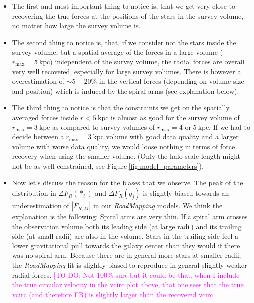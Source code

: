 \documentclass[iop,revtex4,numberedappendix,appendixfloats]{emulateapj}
\newcommand{\RM}{{\sl RoadMapping}}
\newcommand{\Wilma}[1]{\textcolor{Magenta}{#1}}
\begin{document}
\begin{itemize}
\item The first and most important thing to notice is, that we get very close to recovering the true forces at the positions of the stars in the survey volume, no matter how large the survey volume is.
\item The second thing to notice is, that, if we consider not the stars inside the survey volume, but a spatial average of the forces in a large volume ($r_\text{max}=5~\text{kpc}$) independent of the survey volume, the radial forces are overall very well recovered, especially for large survey volumes. There is however a overestimation of $\sim5-20\%$ in the vertical forces (depending on volume size and position) which is induced by the spiral arms (see explanation below).
\item The third thing to notice is that the constraints we get on the spatially averaged forces inside $r<5~\text{kpc}$ is almost as good for the survey volume of $r_\text{max}=3~\text{kpc}$ as compared to survey volumes of $r_\text{max}=4$ or $5~\text{kpc}$. If we had to decide between a $r_\text{max}=3~\text{kpc}$ volume with good data quality and a larger volume with worse data quality, we would loose nothing in terms of force recovery when using the smaller volume. (Only the halo scale length might not be as well constrained, see Figure \ref{fig:model_parameters}).

\item Now let's discuss the reason for the biases that we observe. The peak of the distribution in $\Delta F_R(*_i)$ and $\Delta F_R(g_j)$ is slightly biased towards an underestimation of $|F_{R,M}|$ in our \RM{} models. We think the explanation is the following: Spiral arms are very thin. If a spiral arm crosses the observation volume both its leading side (at large radii) and its trailing side (at small radii) are also in the volume. Stars in the trailing side feel a lower gravitational pull towards the galaxy center than they would if there was no spiral arm. Because there are in general more stars at smaller radii, the \RM{} fit is slightly biased to reproduce in general slightly weaker radial forces. \Wilma{[TO DO: Not 100\% sure but it could be that, when I include the true circular velocity in the vcirc plot above, that one sees that the true vcirc (and therefore FR) is slightly larger than the recovered vcirc.]}


\end{itemize}
\end{document}
